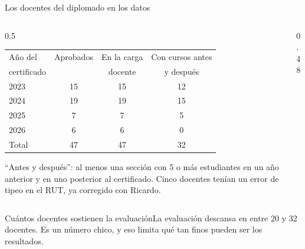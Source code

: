 \documentclass[10pt,aspectratio=169]{beamer}
\newcommand{\sintesis}[2]{%
  \begin{block}{#1}#2\end{block}}
\begin{document}
\begin{frame}{Los docentes del diplomado en los datos}
  \begin{columns}[c]
    \begin{column}{0.5\textwidth}
      \begin{table}\small
        \begin{tabular}{lccc}
          \toprule
          Año del & Aprobados & En la carga & Con cursos antes \\
          certificado & & docente & y después \\
          \midrule
          2023 & 15 & 15 & 12 \\
          2024 & 19 & 19 & 15 \\
          2025 & 7 & 7 & 5 \\
          2026 & 6 & 6 & 0 \\
          \midrule
          Total & 47 & 47 & 32 \\
          \bottomrule
        \end{tabular}
      \end{table}
      {\scriptsize ``Antes y después'': al menos una sección con 5 o más estudiantes en un año anterior y en uno posterior al certificado. Cinco docentes tenían un error de tipeo en el RUT, ya corregido con Ricardo.}
    \end{column}
    \begin{column}{0.48\textwidth}
      \begin{center}
      \end{center}
    \end{column}
  \end{columns}
  \vspace{0.3em}
  \sintesis{Cuántos docentes sostienen la evaluación}{La evaluación descansa en entre 20 y 32 docentes. Es un número chico, y eso limita qué tan finos pueden ser los resultados.}
\end{frame}
\end{document}
